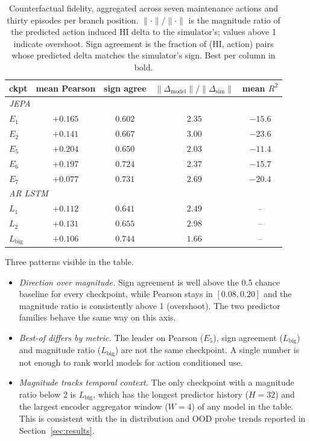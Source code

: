 \begin{table}[h]
\centering
\small
\caption{Counterfactual fidelity, aggregated across seven maintenance
actions and thirty episodes per branch position.
$\lVert\cdot\rVert / \lVert\cdot\rVert$ is the magnitude ratio of the
predicted action induced HI delta to the simulator's; values above 1
indicate overshoot. Sign agreement is the fraction of (HI, action)
pairs whose predicted delta matches the simulator's sign. Best per
column in bold.}
\label{tab:cf_summary}
\begin{tabular}{l c c c c}
\toprule
ckpt & mean Pearson & sign agree & $\lVert\Delta_\mathrm{model}\rVert / \lVert\Delta_\mathrm{sim}\rVert$ & mean $R^2$ \\
\midrule
\multicolumn{5}{l}{\textit{JEPA}} \\
$E_1$        & $+0.165$            & $0.602$           & $2.35$           & $-15.6$ \\
$E_2$        & $+0.141$            & $0.667$           & $3.00$           & $-23.6$ \\
$E_5$        & $\mathbf{+0.204}$   & $0.650$           & $2.03$           & $-11.4$ \\
$E_6$        & $+0.197$            & $0.724$           & $2.37$           & $-15.7$ \\
$E_7$        & $+0.077$            & $0.731$           & $2.69$           & $-20.4$ \\
\midrule
\multicolumn{5}{l}{\textit{AR LSTM}} \\
$L_1$        & $+0.112$            & $0.641$           & $2.49$           & --      \\
$L_2$        & $+0.131$            & $0.655$           & $2.98$           & --      \\
$L_\mathrm{big}$ & $+0.106$        & $\mathbf{0.744}$  & $\mathbf{1.66}$  & --      \\
\bottomrule
\end{tabular}
\end{table}

Three patterns visible in the table.
\begin{itemize}
  \item \emph{Direction over magnitude.} Sign agreement is well above
    the 0.5 chance baseline for every checkpoint, while Pearson stays
    in $[0.08, 0.20]$ and the magnitude ratio is consistently above 1
    (overshoot). The two predictor families behave the same way on
    this axis.
  \item \emph{Best-of differs by metric.} The leader on Pearson ($E_5$),
    sign agreement ($L_\mathrm{big}$) and magnitude ratio
    ($L_\mathrm{big}$) are not the same checkpoint. A single number is
    not enough to rank world models for action conditioned use.
  \item \emph{Magnitude tracks temporal context.} The only checkpoint
    with a magnitude ratio below 2 is $L_\mathrm{big}$, which has the
    longest predictor history ($H{=}32$) and the largest encoder
    aggregator window ($W{=}4$) of any model in the table. This is
    consistent with the in distribution and OOD probe trends reported
    in Section~\ref{sec:results}.
\end{itemize}

